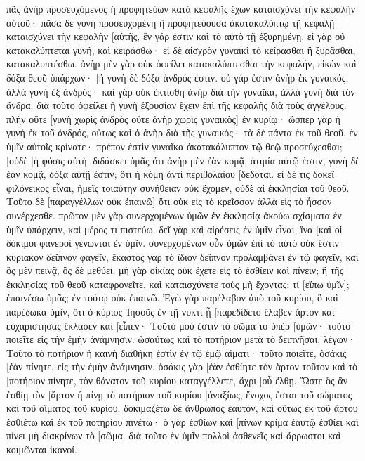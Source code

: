 πᾶς ἀνὴρ προσευχόμενος ἢ προφητεύων κατὰ κεφαλῆς ἔχων καταισχύνει τὴν κεφαλὴν αὐτοῦ· 
πᾶσα δὲ γυνὴ προσευχομένη ἢ προφητεύουσα ἀκατακαλύπτῳ τῇ κεφαλῇ καταισχύνει τὴν κεφαλὴν [αὐτῆς, ἓν γάρ ἐστιν καὶ τὸ αὐτὸ τῇ ἐξυρημένῃ. 
εἰ γὰρ οὐ κατακαλύπτεται γυνή, καὶ κειράσθω· εἰ δὲ αἰσχρὸν γυναικὶ τὸ κείρασθαι ἢ ξυρᾶσθαι, κατακαλυπτέσθω. 
ἀνὴρ μὲν γὰρ οὐκ ὀφείλει κατακαλύπτεσθαι τὴν κεφαλήν, εἰκὼν καὶ δόξα θεοῦ ὑπάρχων· [ἡ γυνὴ δὲ δόξα ἀνδρός ἐστιν. 
οὐ γάρ ἐστιν ἀνὴρ ἐκ γυναικός, ἀλλὰ γυνὴ ἐξ ἀνδρός· 
καὶ γὰρ οὐκ ἐκτίσθη ἀνὴρ διὰ τὴν γυναῖκα, ἀλλὰ γυνὴ διὰ τὸν ἄνδρα. 
διὰ τοῦτο ὀφείλει ἡ γυνὴ ἐξουσίαν ἔχειν ἐπὶ τῆς κεφαλῆς διὰ τοὺς ἀγγέλους. 
πλὴν οὔτε [γυνὴ χωρὶς ἀνδρὸς οὔτε ἀνὴρ χωρὶς γυναικὸς] ἐν κυρίῳ· 
ὥσπερ γὰρ ἡ γυνὴ ἐκ τοῦ ἀνδρός, οὕτως καὶ ὁ ἀνὴρ διὰ τῆς γυναικός· τὰ δὲ πάντα ἐκ τοῦ θεοῦ. 
ἐν ὑμῖν αὐτοῖς κρίνατε· πρέπον ἐστὶν γυναῖκα ἀκατακάλυπτον τῷ θεῷ προσεύχεσθαι; 
[οὐδὲ [ἡ φύσις αὐτὴ] διδάσκει ὑμᾶς ὅτι ἀνὴρ μὲν ἐὰν κομᾷ, ἀτιμία αὐτῷ ἐστιν, 
γυνὴ δὲ ἐὰν κομᾷ, δόξα αὐτῇ ἐστιν; ὅτι ἡ κόμη ἀντὶ περιβολαίου [δέδοται. 
εἰ δέ τις δοκεῖ φιλόνεικος εἶναι, ἡμεῖς τοιαύτην συνήθειαν οὐκ ἔχομεν, οὐδὲ αἱ ἐκκλησίαι τοῦ θεοῦ. 
Τοῦτο δὲ [παραγγέλλων οὐκ ἐπαινῶ] ὅτι οὐκ εἰς τὸ κρεῖσσον ἀλλὰ εἰς τὸ ἧσσον συνέρχεσθε. 
πρῶτον μὲν γὰρ συνερχομένων ὑμῶν ἐν ἐκκλησίᾳ ἀκούω σχίσματα ἐν ὑμῖν ὑπάρχειν, καὶ μέρος τι πιστεύω. 
δεῖ γὰρ καὶ αἱρέσεις ἐν ὑμῖν εἶναι, ἵνα [καὶ οἱ δόκιμοι φανεροὶ γένωνται ἐν ὑμῖν. 
συνερχομένων οὖν ὑμῶν ἐπὶ τὸ αὐτὸ οὐκ ἔστιν κυριακὸν δεῖπνον φαγεῖν, 
ἕκαστος γὰρ τὸ ἴδιον δεῖπνον προλαμβάνει ἐν τῷ φαγεῖν, καὶ ὃς μὲν πεινᾷ, ὃς δὲ μεθύει. 
μὴ γὰρ οἰκίας οὐκ ἔχετε εἰς τὸ ἐσθίειν καὶ πίνειν; ἢ τῆς ἐκκλησίας τοῦ θεοῦ καταφρονεῖτε, καὶ καταισχύνετε τοὺς μὴ ἔχοντας; τί [εἴπω ὑμῖν]; ἐπαινέσω ὑμᾶς; ἐν τούτῳ οὐκ ἐπαινῶ. 
Ἐγὼ γὰρ παρέλαβον ἀπὸ τοῦ κυρίου, ὃ καὶ παρέδωκα ὑμῖν, ὅτι ὁ κύριος Ἰησοῦς ἐν τῇ νυκτὶ ᾗ [παρεδίδετο ἔλαβεν ἄρτον 
καὶ εὐχαριστήσας ἔκλασεν καὶ [εἶπεν· Τοῦτό μού ἐστιν τὸ σῶμα τὸ ὑπὲρ [ὑμῶν· τοῦτο ποιεῖτε εἰς τὴν ἐμὴν ἀνάμνησιν. 
ὡσαύτως καὶ τὸ ποτήριον μετὰ τὸ δειπνῆσαι, λέγων· Τοῦτο τὸ ποτήριον ἡ καινὴ διαθήκη ἐστὶν ἐν τῷ ἐμῷ αἵματι· τοῦτο ποιεῖτε, ὁσάκις [ἐὰν πίνητε, εἰς τὴν ἐμὴν ἀνάμνησιν. 
ὁσάκις γὰρ [ἐὰν ἐσθίητε τὸν ἄρτον τοῦτον καὶ τὸ [ποτήριον πίνητε, τὸν θάνατον τοῦ κυρίου καταγγέλλετε, ἄχρι [οὗ ἔλθῃ. 
Ὥστε ὃς ἂν ἐσθίῃ τὸν [ἄρτον ἢ πίνῃ τὸ ποτήριον τοῦ κυρίου [ἀναξίως, ἔνοχος ἔσται τοῦ σώματος καὶ τοῦ αἵματος τοῦ κυρίου. 
δοκιμαζέτω δὲ ἄνθρωπος ἑαυτόν, καὶ οὕτως ἐκ τοῦ ἄρτου ἐσθιέτω καὶ ἐκ τοῦ ποτηρίου πινέτω· 
ὁ γὰρ ἐσθίων καὶ [πίνων κρίμα ἑαυτῷ ἐσθίει καὶ πίνει μὴ διακρίνων τὸ [σῶμα. 
διὰ τοῦτο ἐν ὑμῖν πολλοὶ ἀσθενεῖς καὶ ἄρρωστοι καὶ κοιμῶνται ἱκανοί. 
